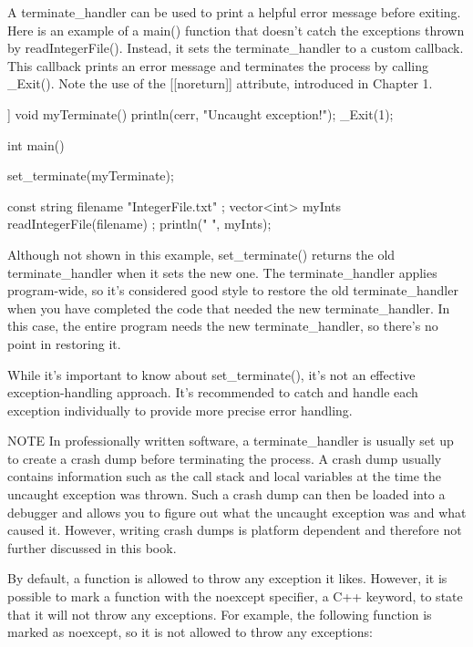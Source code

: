 A terminate\_handler can be used to print a helpful error message before exiting. Here is an example of a main() function that doesn’t catch the exceptions thrown by readIntegerFile(). Instead, it sets the terminate\_handler to a custom callback. This callback prints an error message and terminates the process by calling \_Exit(). Note the use of the [[noreturn]] attribute, introduced in Chapter 1.

\begin{cpp}
[[noreturn]] void myTerminate()
{
    println(cerr, "Uncaught exception!");
    _Exit(1);
}

int main()
{
    set_terminate(myTerminate);

    const string filename { "IntegerFile.txt" };
    vector<int> myInts { readIntegerFile(filename) };
    println("{} ", myInts);
}
\end{cpp}

Although not shown in this example, set\_terminate() returns the old terminate\_handler when it sets the new one. The terminate\_handler applies program-wide, so it’s considered good style to restore the old terminate\_handler when you have completed the code that needed the new terminate\_handler. In this case, the entire program needs the new terminate\_handler, so there’s no point in restoring it.

While it’s important to know about set\_terminate(), it’s not an effective exception-handling approach. It’s recommended to catch and handle each exception individually to provide more precise error handling.

\begin{myNotic}{NOTE}
In professionally written software, a terminate\_handler is usually set up to create a crash dump before terminating the process. A crash dump usually contains information such as the call stack and local variables at the time the uncaught exception was thrown. Such a crash dump can then be loaded into a debugger and allows you to figure out what the uncaught exception was and what caused it. However, writing crash dumps is platform dependent and therefore not further discussed in this book.
\end{myNotic}


By default, a function is allowed to throw any exception it likes. However, it is possible to mark a function with the noexcept specifier, a C++ keyword, to state that it will not throw any exceptions. For example, the following function is marked as noexcept, so it is not allowed to throw any exceptions:

